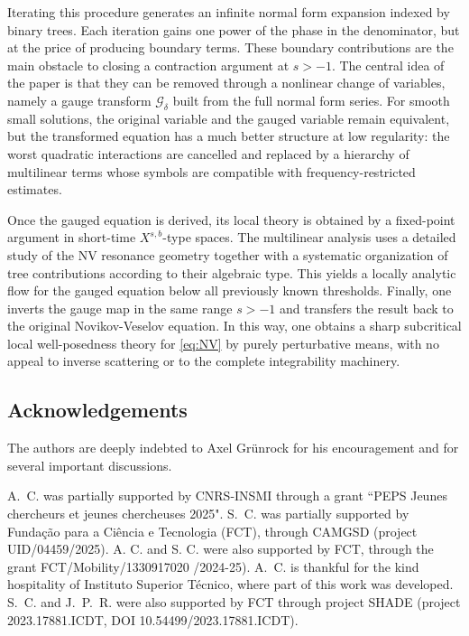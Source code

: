 \documentclass[a4paper,
11pt,  reqno]{amsart}
\newcommand{\5}{\textup{V}}
\theoremstyle{remark}
\newcommand{\Gc}{\mathcal{G}}
\numberwithin{equation}{section}
\numberwithin{theorem}{section}
\begin{document}
Iterating this procedure generates an infinite normal form expansion indexed by binary
trees. Each iteration gains one power of the phase in the denominator, but at the price of
producing boundary terms. These boundary contributions are the main obstacle to closing a
contraction argument at $s>-1$. The central idea of the paper is that they can be removed
through a nonlinear change of variables, namely a gauge transform $\Gc_\delta$ built from
the full normal form series. For smooth small solutions, the original variable and the
gauged variable remain equivalent, but the transformed equation has a much better
structure at low regularity: the worst quadratic interactions are cancelled and replaced by
a hierarchy of multilinear terms whose symbols are compatible with frequency-restricted
estimates.


Once the gauged equation is derived, its local theory is obtained by a fixed-point
argument in short-time $X^{s,b}$-type spaces. The multilinear analysis uses a detailed
study of the NV resonance geometry together with a systematic organization of tree
contributions according to their algebraic type. This yields a locally analytic flow for the
gauged equation below all previously known thresholds. Finally, one inverts the gauge map
in the same range $s>-1$ and transfers the result back to the original Novikov-Veselov
equation. In this way, one obtains a sharp subcritical local well-posedness theory for
\eqref{eq:NV} by purely perturbative means, with no appeal to inverse scattering or to the
complete integrability machinery.




\bigskip


\subsection{Acknowledgements} 
The authors are deeply indebted to Axel Grünrock for his encouragement and for several important discussions.

\medskip

A.~C. was partially supported by  CNRS-INSMI through a grant ``PEPS Jeunes chercheurs et jeunes chercheuses 2025". S.~C. was partially supported by Funda\c{c}\~ao para a Ci\^encia e Tecnologia (FCT), through CAMGSD (project UID/04459/2025). A. C. and S. C. were also supported by FCT, through the grant FCT/Mobility/1330917020 /2024-25). A.~C. is thankful for the kind hospitality of Instituto Superior Técnico, where part of this work was developed. S.~C. and J.~P.~R. were also supported by FCT through project SHADE (project 2023.17881.ICDT, DOI  10.54499/2023.17881.ICDT).
\end{document}
